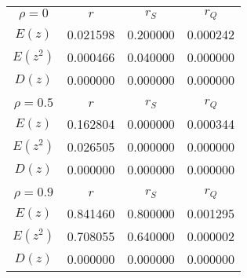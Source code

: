 \begin{table}[H]
    \centering
    \begin{tabular}{c|c|c|c}
        $$\rho=0$$ & $r$ & $r_{S}$ & $r_{Q}$ \\
        $E(z)$ & 0.021598 & 0.200000 & 0.000242 \\
        $E(z^2)$ & 0.000466 & 0.040000 & 0.000000 \\
        $D(z)$ & 0.000000 & 0.000000 & 0.000000 \\
        \hline
        \multicolumn{4}{c}{} \\
        $$\rho=0.5$$ & $r$ & $r_{S}$ & $r_{Q}$ \\
        $E(z)$ & 0.162804 & 0.000000 & 0.000344 \\
        $E(z^2)$ & 0.026505 & 0.000000 & 0.000000 \\
        $D(z)$ & 0.000000 & 0.000000 & 0.000000 \\
        \hline
        \multicolumn{4}{c}{} \\
        $$\rho=0.9$$ & $r$ & $r_{S}$ & $r_{Q}$ \\
        $E(z)$ & 0.841460 & 0.800000 & 0.001295 \\
        $E(z^2)$ & 0.708055 & 0.640000 & 0.000002 \\
        $D(z)$ & 0.000000 & 0.000000 & 0.000000 \\
    \end{tabular}
    \caption{}
    \label{}
\end{table}